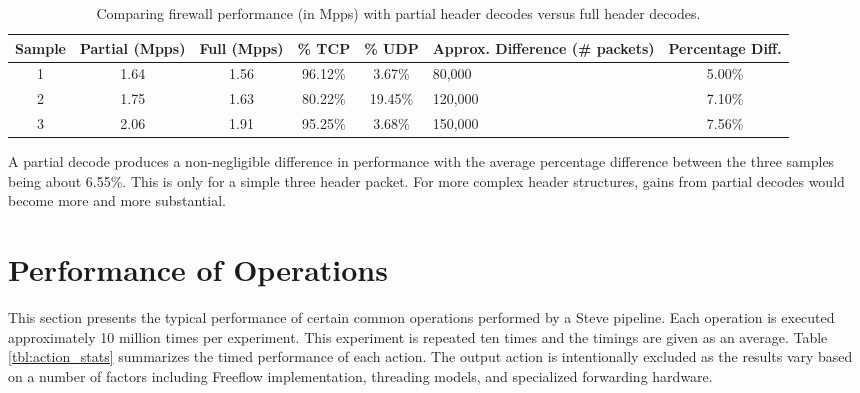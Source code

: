 \begin{table}[ht]
\caption{Comparing firewall performance (in Mpps) with partial header decodes versus full header decodes.}
\begin{center}
\begin{tabularx}{\linewidth}{| c || c | c | c | c | X | c |}
\hline
Sample & Partial (Mpps) & Full (Mpps) & \% TCP & \% UDP & Approx. Difference (\# packets) & Percentage Diff. \\
\hline
1 & 1.64 & 1.56 & 96.12\% & 3.67\% & 80,000 & 5.00\% \\
\hline
2 & 1.75 & 1.63 & 80.22\% & 19.45\% & 120,000 & 7.10\% \\
\hline
3 & 2.06 & 1.91 & 95.25\% & 3.68\% & 150,000 & 7.56\% \\ 
\hline
\end{tabularx}
\end{center}
\label{tbl:firewall_cmp}
\end{table}


A partial decode produces a non-negligible difference in performance with the average percentage difference between the three samples being about 6.55\%. This is only for a simple three header packet. For more complex header structures, gains from partial decodes would become more and more substantial.


\section{Performance of Operations} \label{exp:action_performance}

This section presents the typical performance of certain common operations performed by a Steve pipeline. Each operation is executed approximately 10 million times per experiment. This experiment is repeated ten times and the timings are given as an average. Table \ref{tbl:action_stats} summarizes the timed performance of each action. The output action is intentionally excluded as the results vary based on a number of factors including Freeflow implementation, threading models, and specialized forwarding hardware.

